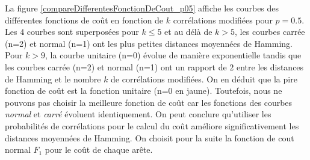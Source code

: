 La figure \ref{compareDifferentesFonctionDeCout_p05} affiche les courbes des diff\'erentes fonctions de co\^ut en fonction de $k$ corr\'elations modifi\'ees pour $p = 0.5$.
\newline
Les $4$ courbes sont superpos\'ees pour $k\le5$ et au d\'el\`a de $k>5$, les courbes carr\'ee (n=2) et normal (n=1) ont les plus petites distances moyenn\'ees de Hamming.
Pour $k>9$, la courbe unitaire (n=0) \'evolue de mani\`ere exponentielle tandis que les courbes carr\'ee (n=2) et normal (n=1) ont un rapport de $2$ entre les distances de Hamming et le nombre $k$ de corr\'elations modifi\'ees.
On en d\'eduit que la pire fonction de co\^ut est la fonction unitaire (n=0 en jaune).
\newline
Toutefois, nous ne pouvons pas choisir la meilleure fonction de co\^ut car les fonctions des courbes {\em normal} et {\em carr\'e} \'evoluent identiquement.
 On peut conclure qu'utiliser les probabilit\'es de corr\'elations pour le calcul du co\^ut am\'eliore significativement les distances moyenn\'ees de Hamming.
 \newline
 On choisit pour la suite la fonction de cout normal $F_1$ pour le co\^ut de chaque ar\^ete. 